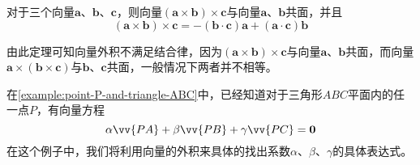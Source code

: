 \begin{theorem}
  对于三个向量$\bm{a}$、$\bm{b}$、$\bm{c}$，则向量$(\bm{a}\times\bm{b})\times\bm{c}$与向量$\bm{a}$、$\bm{b}$共面，并且
  \[ (\bm{a}\times\bm{b})\times\bm{c} = -(\bm{b}\cdot\bm{c})\bm{a}+(\bm{a}\cdot\bm{c})\bm{b} \]
\end{theorem}

由此定理可知向量外积不满足结合律，因为$(\bm{a}\times\bm{b})\times\bm{c}$与向量$\bm{a}$、$\bm{b}$共面，而向量$\bm{a}\times(\bm{b}\times\bm{c})$与$\bm{b}$、$\bm{c}$共面，一般情况下两者并不相等。


\begin{example}
  \label{example:outer-product-coefficient-pa-pb-pc}
  在\autoref{example:point-P-and-triangle-ABC}中，已经知道对于三角形$ABC$平面内的任一点$P$，有向量方程
  \begin{equation}
    \label{eq:vector-expr-for-p-coline-abc}
   \alpha \vv{PA} + \beta \vv{PB} +\gamma \vv{PC} = \bm{0} 
  \end{equation}
  在这个例子中，我们将利用向量的外积来具体的找出系数$\alpha$、$\beta$、$\gamma$的具体表达式。


\end{example}
